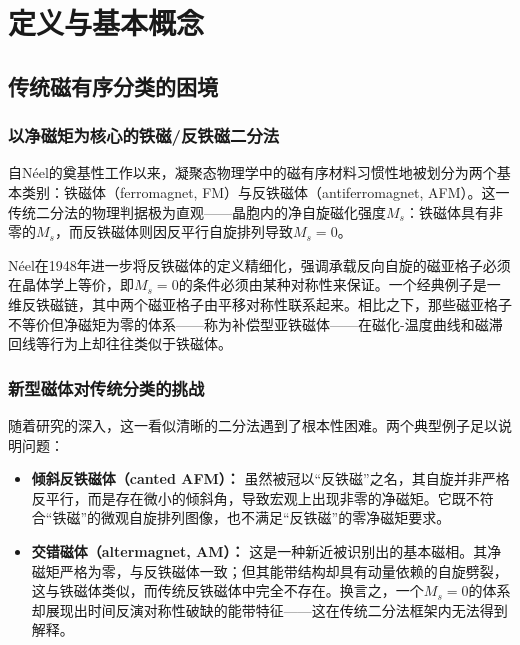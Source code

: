 ﻿%

\chapter{定义与基本概念}
\label{chap:definition}

\section{传统磁有序分类的困境}

\subsection{以净磁矩为核心的铁磁/反铁磁二分法}

自N\'{e}el的奠基性工作以来，凝聚态物理学中的磁有序材料习惯性地被划分为两个基本类别：铁磁体（ferromagnet, FM）与反铁磁体（antiferromagnet, AFM）。这一传统二分法的物理判据极为直观——晶胞内的净自旋磁化强度$M_s$：铁磁体具有非零的$M_s$，而反铁磁体则因反平行自旋排列导致$M_s=0$。

N\'{e}el在1948年进一步将反铁磁体的定义精细化，强调承载反向自旋的磁亚格子必须在晶体学上等价，即$M_s=0$的条件必须由某种对称性来保证\cite{liu_symmetry_2026}。一个经典例子是一维反铁磁链，其中两个磁亚格子由平移对称性联系起来。相比之下，那些磁亚格子不等价但净磁矩为零的体系——称为补偿型亚铁磁体——在磁化-温度曲线和磁滞回线等行为上却往往类似于铁磁体\cite{liu_symmetry_2026}。

\subsection{新型磁体对传统分类的挑战}

随着研究的深入，这一看似清晰的二分法遇到了根本性困难。两个典型例子足以说明问题：

\begin{itemize}
\item \textbf{倾斜反铁磁体（canted AFM）：} 虽然被冠以“反铁磁”之名，其自旋并非严格反平行，而是存在微小的倾斜角，导致宏观上出现非零的净磁矩。它既不符合“铁磁”的微观自旋排列图像，也不满足“反铁磁”的零净磁矩要求。
\item \textbf{交错磁体（altermagnet, AM）：} 这是一种新近被识别出的基本磁相。其净磁矩严格为零，与反铁磁体一致；但其能带结构却具有动量依赖的自旋劈裂，这与铁磁体类似，而传统反铁磁体中完全不存在。换言之，一个$M_s=0$的体系却展现出时间反演对称性破缺的能带特征——这在传统二分法框架内无法得到解释。
\end{itemize}

